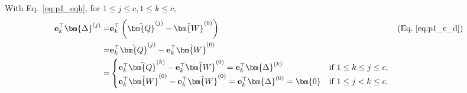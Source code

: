 \documentclass{article} %
\begin{document}
With Eq.~\ref{eq:p1_eqh}, for $1 \le j \le c, 1 \le k \le c$,
\begin{equation}
\begin{aligned}
\mathbf{e}_{k}^\top \bm{\Delta}^{(j)}
= & \mathbf{e}_{k}^\top \left( \hat{\bm{Q}}^{(j)} - \hat{\bm{W}}^{(0)} \right) & \text{(Eq.~\ref{eq:p1_c_d})} \\
= & \mathbf{e}_{k}^\top \hat{\bm{Q}}^{(j)} - \mathbf{e}_{k}^\top \hat{\bm{W}}^{(0)} \\
= & \begin{cases}
\mathbf{e}_{k}^\top \hat{\bm{Q}}^{(k)} - \mathbf{e}_{k}^\top \hat{\bm{W}}^{(0)}
= \mathbf{e}_{k}^\top \bm{\Delta}^{(k)} & \text{if } 1 \le k \le j \le c , \\
\mathbf{e}_{k}^\top \hat{\bm{W}}^{(0)} - \mathbf{e}_{k}^\top \hat{\bm{W}}^{(0)}
= \mathbf{e}_{k}^\top \bm{\Delta}^{(0)} = \bm{0} & \text{if } 1 \le j < k \le c .
\end{cases}
\end{aligned}
\label{eq:p1_ed}
\end{equation}
\end{document}
